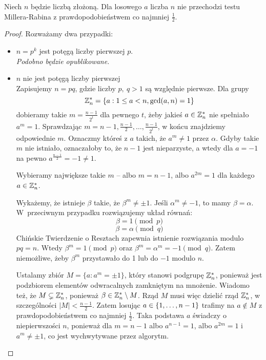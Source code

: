 \newpage
\begin{lemma}
    Niech \( n \) będzie liczbą złożoną. Dla losowego \( a \) liczba \( n \) nie przechodzi testu Millera-Rabina z prawdopodobieństwem co najmniej \( \frac{1}{2} \).
\end{lemma}
\begin{proof}
    Rozważamy dwa przypadki:
    \begin{itemize}
        \item \( n = p^k \) jest potęgą liczby pierwszej \( p \). \\
        \textit{Podobno będzie opublikowane.}
        \item \( n \) nie jest potęgą liczby pierwszej \\
        Zapisujemy \( n = pq \), gdzie liczby \( p, \ q > 1 \) są względnie pierwsze.    
        Dla grupy
        \[
            \integer_n^* = \set{a : 1 \le a < n, \gcd(a,n) = 1}
        \]    
        dobieramy takie \( m = \frac{n-1}{2^t} \) dla pewnego \( t \), żeby jakieś \( a \in \mathbb{Z}_n^* \) nie spełniało \( a^m = 1 \).
        Sprawdzając \( m = n-1, \frac{n-1}{2}, \dots, \frac{n-1}{2^t} \), w końcu znajdziemy odpowiednie \( m \). Oznaczmy któreś z \( a \) takich, że \( a^m \neq 1 \) przez \( \alpha \). Gdyby takie \( m \) nie istniało, oznaczałoby to, że \( n-1 \) jest nieparzyste, a wtedy dla \( a = -1\)  na pewno \( a^{\frac{n-1}{2}} = -1 \ne 1 \).
    
        Wybieramy największe takie \( m \) -- albo \( m = n - 1 \), albo \( a^{2m} = 1 \) dla każdego \( a \in \mathbb{Z}_n^* \).
    
        Wykażemy, że istnieje \( \beta \) takie, że \( \beta^m \neq \pm 1 \). Jeśli \( \alpha^m \neq -1 \), to mamy \( \beta = \alpha \). W~przeciwnym przypadku rozwiązujemy układ równań:
        \[
            \beta = 1 \pmod{p}
        \]
        \[
            \beta = \alpha \pmod{q}
        \]
        Chińskie Twierdzenie o Resztach zapewnia istnienie rozwiązania modulo \( pq = n \). Wtedy \( \beta^m = 1 \pmod{p} \) oraz \( \beta^m = \alpha^m = -1 \pmod{q} \).
        Zatem niemożliwe, żeby \( \beta^m \) przystawało do 1 lub do \( -1 \) modulo \( n \).
    
        Ustalamy zbiór \( M = \{a : a^m = \pm 1\} \), który stanowi podgrupę \( \mathbb{Z}_n^* \), ponieważ jest podzbiorem elementów odwracalnych zamkniętym na mnożenie.
        Wiadomo też, że \( M \subsetneq \mathbb{Z}_n^* \), ponieważ \( \beta \in \mathbb{Z}_n^* \setminus M \). Rząd \( M \) musi więc dzielić rząd \( \mathbb{Z}_n^* \), w szczególności \( |M| < \frac{n-1}{2} \).
        Zatem losując \( a \in \set{1, \dots, n-1} \) trafimy na \( a \notin M \) z prawdopodobieństwem co najmniej \( \frac{1}{2} \). Taka podstawa \( a \) świadczy o niepierwszości \( n \), ponieważ dla \( m = n-1 \) albo \( a^{n-1} = 1 \), albo \( a^{2m} = 1 \) i \( a^m \neq \pm 1 \), co jest wychwytywane przez algorytm.
    \end{itemize}
\end{proof}
